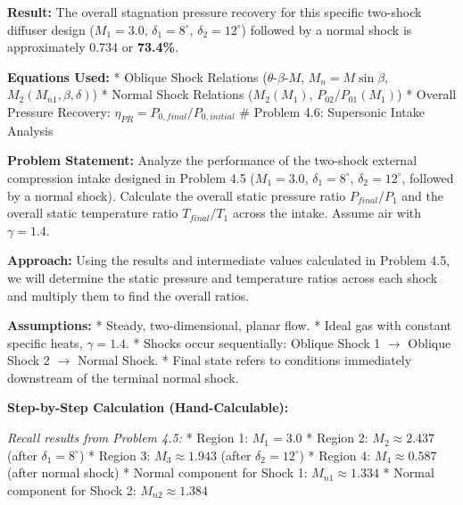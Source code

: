 \textbf{Result:} The overall stagnation pressure recovery for this
specific two-shock diffuser design (\(M_1=3.0\), \(\delta_1=8^\circ\),
\(\delta_2=12^\circ\)) followed by a normal shock is approximately
\(\mathbf{0.734}\) or \textbf{73.4\%}.

\textbf{Equations Used:} * Oblique Shock Relations
(\(\theta\)-\(\beta\)-\(M\), \(M_n = M \sin\beta\),
\(M_2(M_{n1}, \beta, \delta)\)) * Normal Shock Relations (\(M_2(M_1)\),
\(P_{02}/P_{01}(M_1)\)) * Overall Pressure Recovery:
\(\eta_{PR} = P_{0, final}/P_{0, initial}\) \# Problem 4.6: Supersonic
Intake Analysis

\textbf{Problem Statement:} Analyze the performance of the two-shock
external compression intake designed in Problem 4.5 (\(M_1=3.0\),
\(\delta_1=8^\circ\), \(\delta_2=12^\circ\), followed by a normal
shock). Calculate the overall static pressure ratio \(P_{final}/P_1\)
and the overall static temperature ratio \(T_{final}/T_1\) across the
intake. Assume air with \(\gamma = 1.4\).

\textbf{Approach:} Using the results and intermediate values calculated
in Problem 4.5, we will determine the static pressure and temperature
ratios across each shock and multiply them to find the overall ratios.

\textbf{Assumptions:} * Steady, two-dimensional, planar flow. * Ideal
gas with constant specific heats, \(\gamma = 1.4\). * Shocks occur
sequentially: Oblique Shock 1 \(\to\) Oblique Shock 2 \(\to\) Normal
Shock. * Final state refers to conditions immediately downstream of the
terminal normal shock.

\textbf{Step-by-Step Calculation (Hand-Calculable):}

\emph{Recall results from Problem 4.5:} * Region 1: \(M_1 = 3.0\) *
Region 2: \(M_2 \approx 2.437\) (after \(\delta_1=8^\circ\)) * Region 3:
\(M_3 \approx 1.943\) (after \(\delta_2=12^\circ\)) * Region 4:
\(M_4 \approx 0.587\) (after normal shock) * Normal component for Shock
1: \(M_{n1} \approx 1.334\) * Normal component for Shock 2:
\(M_{n2} \approx 1.384\)


